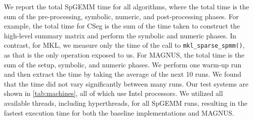 We report the total SpGEMM time for all algorithms, where the total time is the sum of the pre-processing, symbolic, numeric, and post-processing phases.
For example, the total time for CSeg is the sum of the time taken to construct the high-level summary matrix and perform the symbolic and numeric phases.  
In contrast, for MKL, we measure only the time of the call to \texttt{mkl\_sparse\_spmm()}, as that is the only operation exposed to us.
For MAGNUS, the total time is the sum of the setup, symbolic, and numeric phases.
We perform one warm-up run and then extract the time by taking the average of the next 10 runs.
We found that the time did not vary significantly between many runs.
Our test systems are shown in \autoref{tab:machines}, all of which use Intel processors.
We utilized all available threads, including hyperthreads, for all SpGEMM runs, resulting in the fastest execution time for both the baseline implementations and MAGNUS.

\begin{table}[htbp]
\caption{Hardware specifications of the test systems.
All systems are a single multisocket node with Intel CPUs.}
\begin{center}
\label{tab:machines}
\end{center}
\end{table}

